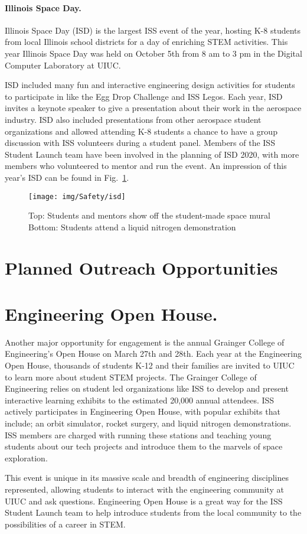 \paragraph{Illinois Space Day.} Illinois Space Day (ISD) is the largest ISS event of the year, hosting K-8 students from local Illinois school districts for a day of enriching STEM activities. This year Illinois Space Day was held on October 5th from 8 am to 3 pm in the Digital Computer Laboratory at UIUC.

ISD included many fun and interactive engineering design activities for students to participate in like the Egg Drop Challenge and ISS Legos. Each year, ISD invites a keynote speaker to give a presentation about their work in the aerospace industry. ISD also included presentations from other aerospace student organizations and allowed attending K-8 students a chance to have a group discussion with ISS volunteers during a student panel. Members of the ISS Student Launch team have been involved in the planning of ISD 2020, with more members who volunteered to mentor and run the event. An impression of this year's ISD can be found in Fig.~\ref{fig:Safety:ISD}.

\begin{figure}[H]
	\centering
	\texttt{[image: img/Safety/isd]}
	\caption{Top: Students and mentors show off the student-made space mural
Bottom: Students attend a liquid nitrogen demonstration}
	\label{fig:Safety:ISD}
\end{figure}

\section{Planned Outreach Opportunities}

\section{Engineering Open House.} Another major opportunity for engagement is the annual Grainger College of Engineering’s Open House on March 27th and 28th. Each year at the Engineering Open House, thousands of students K-12 and their families are invited to UIUC to learn more about student STEM projects. The Grainger College of Engineering relies on student led organizations like ISS to develop and present interactive learning exhibits to the estimated 20,000 annual attendees. ISS actively participates in Engineering Open House, with popular exhibits that include; an orbit simulator, rocket surgery, and liquid nitrogen demonstrations. ISS members are charged with running these stations and teaching young students about our tech projects and introduce them to the marvels of space exploration.

This event is unique in its massive scale and breadth of engineering disciplines represented, allowing students to interact with the engineering community at UIUC and ask questions. Engineering Open House is a great way for the ISS Student Launch team to help introduce students from the local community to the possibilities of a career in STEM.
